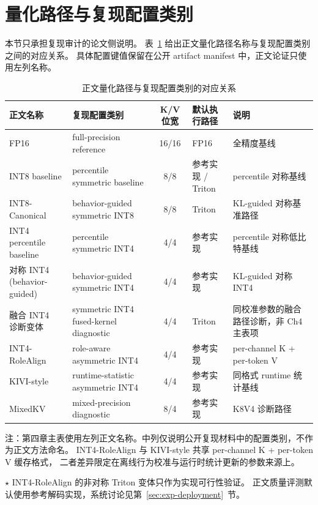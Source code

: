 \section{量化路径与复现配置类别}
\label{sec:app-kv-modes}

本节只承担复现审计的论文侧说明。
表~\ref{tab:ch3-kv-modes} 给出正文量化路径名称与复现配置类别之间的对应关系。
具体配置键值保留在公开 artifact manifest 中，正文论证只使用左列名称。

\begin{table}[!htbp]
  \centering
  \caption{正文量化路径与复现配置类别的对应关系}
  \label{tab:ch3-kv-modes}
  \scriptsize
  \begin{threeparttable}
  \setlength{\tabcolsep}{3pt}
  \renewcommand{\arraystretch}{1.08}
  \begin{tabularx}{\linewidth}{p{2.45cm}p{2.75cm}cp{2.05cm}X}
    \toprule
    \textbf{正文名称} & \textbf{复现配置类别} & \textbf{K/V 位宽} & \textbf{默认执行路径} & \textbf{说明} \\
    \midrule
    FP16 & full-precision reference & 16/16 & FP16 & 全精度基线 \\
    INT8 baseline & percentile symmetric baseline & 8/8 & \makecell[l]{参考实现 /\\Triton} & percentile 对称基线 \\
    INT8-Canonical & behavior-guided symmetric INT8 & 8/8 & Triton & KL-guided 对称基准路径 \\
    INT4 percentile baseline & percentile symmetric INT4 & 4/4 & 参考实现 & percentile 对称低比特基线 \\
    \makecell[l]{对称 INT4\\(behavior-guided)} & behavior-guided symmetric INT4 & 4/4 & 参考实现 & KL-guided 对称 INT4 \\
    \makecell[l]{融合 INT4\\诊断变体} & symmetric INT4 fused-kernel diagnostic & 4/4 & Triton & 同校准参数的融合路径诊断，非 Ch4 主表项 \\
    INT4-RoleAlign & role-aware asymmetric INT4 & 4/4 & 参考实现\tnote{$\star$} & per-channel K + per-token V \\
    KIVI-style & runtime-statistic asymmetric INT4 & 4/4 & 参考实现 & 同格式 runtime 统计基线 \\
    MixedKV & mixed-precision diagnostic & 8/4 & 参考实现 & K8V4 诊断路径 \\
    \bottomrule
  \end{tabularx}
  \begin{tablenotes}
    \small
    \item 注：第四章主表使用左列正文名称。中列仅说明公开复现材料中的配置类别，不作为正文方法命名。
    INT4-RoleAlign 与 KIVI-style 共享 per-channel K + per-token V 缓存格式，
    二者差异限定在离线行为校准与运行时统计更新的参数来源上。
    \item[$\star$] INT4-RoleAlign 的非对称 Triton 变体只作为实现可行性验证。
    正文质量评测默认使用参考解码实现，系统讨论见第~\ref{sec:exp-deployment}~节。
  \end{tablenotes}
  \end{threeparttable}
\end{table}

